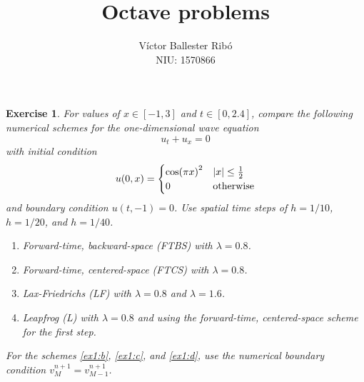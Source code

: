 \documentclass[10pt,a4paper]{article}
\title{\bfseries\Large Octave problems}
\author{Víctor Ballester Ribó\\NIU: 1570866}
\date{\parbox{\linewidth}{\centering
  Integració numèrica d'equacions en derivades parcials\endgraf
  Grau en Matemàtiques\endgraf
  Universitat Autònoma de Barcelona\endgraf
  Juny de 2023}}
\newtheorem{exercici}{Exercise}
\theoremstyle{definition}
\theoremstyle{remark}
\begin{document}
\maketitle
\setcounter{exercici}{2}
\begin{exercici}
  For values of $x\in[-1,3]$ and $t\in [0,2.4]$, compare the following numerical schemes for the one-dimensional wave equation
  $$
    u_t+u_x=0
  $$
  with initial condition
  $$
    u(0,x)=\begin{cases}
      {\cos(\pi x)}^2 & \abs{x}\leq \frac{1}{2} \\
      0               & \text{otherwise}
    \end{cases}
  $$
  and boundary condition $u(t,-1)=0$. Use spatial time steps of $h=1/10$, $h=1/20$, and $h=1/40$.
  \begin{enumerate}
    \item Forward-time, backward-space (FTBS) with $\lambda =0.8$.
          \item\label{ex1:b} Forward-time, centered-space (FTCS) with $\lambda =0.8$.
          \item\label{ex1:c} Lax-Friedrichs (LF) with $\lambda =0.8$ and $\lambda =1.6$.
          \item\label{ex1:d} Leapfrog (L) with $\lambda =0.8$ and using the forward-time, centered-space scheme for the first step.
  \end{enumerate}
  For the schemes \ref{ex1:b}, \ref{ex1:c}, and \ref{ex1:d}, use the numerical boundary condition $v_M^{n+1}=v_{M-1}^{n+1}$.
\end{exercici}
\end{document}
